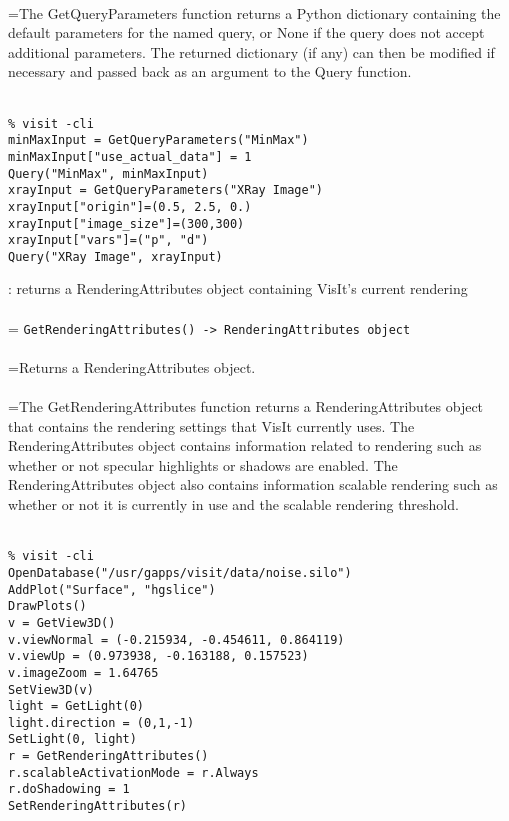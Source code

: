 \documentclass[10pt,a4paper]{report}
\begin{document}
 \\ 
\hangindent=\parindent The GetQueryParameters function returns a Python dictionary containing the default parameters for the named query, or None if the query does not accept additional parameters.  The returned dictionary (if any) can then be modified if necessary and passed back as an argument to the Query function. \\[-3mm] 

\\[-6mm]
\begin{verbatim}% visit -cli
minMaxInput = GetQueryParameters("MinMax")
minMaxInput["use_actual_data"] = 1
Query("MinMax", minMaxInput)
xrayInput = GetQueryParameters("XRay Image")
xrayInput["origin"]=(0.5, 2.5, 0.)
xrayInput["image_size"]=(300,300)
xrayInput["vars"]=("p", "d")
Query("XRay Image", xrayInput)
\end{verbatim}
\newpage


{}
: returns a RenderingAttributes object containing VisIt's current rendering\\[-3mm]

 \\ 
\hangindent=\parindent 
\verb!GetRenderingAttributes() -> RenderingAttributes object!\\ [-3mm]

 \\ 
\hangindent=\parindent Returns a RenderingAttributes object. \\[-3mm] 

 \\ 
\hangindent=\parindent The GetRenderingAttributes function returns a RenderingAttributes object that contains the rendering settings that VisIt currently uses. The RenderingAttributes object contains information related to rendering such as whether or not specular highlights or shadows are enabled. The RenderingAttributes object also contains information scalable rendering such as whether or not it is currently in use and the scalable rendering threshold. \\[-3mm] 

\\[-6mm]
\begin{verbatim}% visit -cli
OpenDatabase("/usr/gapps/visit/data/noise.silo")
AddPlot("Surface", "hgslice")
DrawPlots()
v = GetView3D()
v.viewNormal = (-0.215934, -0.454611, 0.864119)
v.viewUp = (0.973938, -0.163188, 0.157523)
v.imageZoom = 1.64765
SetView3D(v)
light = GetLight(0)
light.direction = (0,1,-1)
SetLight(0, light)
r = GetRenderingAttributes()
r.scalableActivationMode = r.Always
r.doShadowing = 1
SetRenderingAttributes(r)
\end{verbatim}
\newpage
\end{document}
